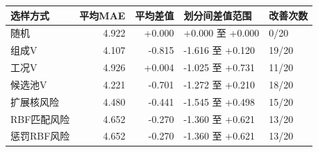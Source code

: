 \begin{tabular}{lrrll}\toprule
选样方式 & 平均MAE & 平均差值 & 划分间差值范围 & 改善次数 \\ \midrule
随机 & 4.922 & +0.000 & +0.000 至 +0.000 & 0/20 \\
组成V & 4.107 & -0.815 & -1.616 至 +0.120 & 19/20 \\
工况V & 4.926 & +0.004 & -1.025 至 +0.731 & 11/20 \\
候选池V & 4.221 & -0.701 & -1.272 至 +0.210 & 18/20 \\
扩展核风险 & 4.480 & -0.441 & -1.545 至 +0.498 & 15/20 \\
RBF匹配风险 & 4.652 & -0.270 & -1.360 至 +0.621 & 13/20 \\
惩罚RBF风险 & 4.652 & -0.270 & -1.360 至 +0.621 & 13/20 \\
\bottomrule\end{tabular}
